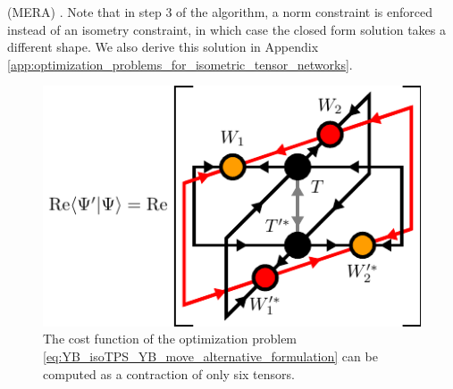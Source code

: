 (MERA) \cite{cite:algorithms_for_entanglement_renormalization, cite:algorithms_for_entanglement_renormalization_boundaries_impurities_interfaces}. Note that in step 3 of the algorithm, a norm constraint is enforced instead of an isometry constraint, in which case the closed form solution takes a different shape. We also derive this solution in Appendix \ref{app:optimization_problems_for_isometric_tensor_networks}.\par
\begin{figure}
	\centering
	\includegraphics[scale=1]{figures/tikz/YB_isoTPS/yang_baxter_move_iterative/yang_baxter_move_iterative_a.pdf}
	\caption{The cost function of the optimization problem \eqref{eq:YB_isoTPS_YB_move_alternative_formulation} can be computed as a contraction of only six tensors.}
	\label{fig:YB_move_iterate_polar_overlap}
\end{figure}
